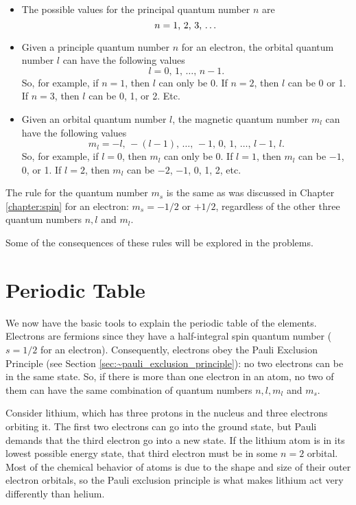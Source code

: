 \begin{itemize}
    \item The possible values for the principal quantum number $n$ are 
     \begin{equation}
     n = \mbox{1, 2, 3, \dots}
\end{equation}
\item Given a principle quantum number $n$ for an electron, the
  orbital quantum number $l$ can have the following values
    \begin{equation}
      l= 0,\, 1,\, \dots,\, n-1  .
    \label{eq:lquantumnumber}
    \end{equation}
    So, for example, if $n=1$, then $l$ can only be 0.  If $n=2$, then
    $l$ can be 0 or 1.  If $n=3$, then $l$ can be 0, 1, or 2.  Etc.
  \item Given an orbital quantum number $l$, the magnetic quantum
    number $m_l$ can have the following values
    \begin{equation}
      m_l=-l,\, -(l-1),\, \dots,\, -1,\, 0,\, 1,\, \dots,\, l-1,\, l  .
    \label{eq:mlquantumnumber}
    \end{equation}
    So, for example, if $l=0$, then $m_l$ can only be 0.  If $l=1$,
    then $m_l$ can be $-1$, 0, or 1.  If $l=2$, then $m_l$ can be
    $-2$, $-1$, 0, 1, 2,  etc.
\end{itemize}
The rule for the quantum number $m_s$ is the same as was discussed
in Chapter \ref{chapter:spin} for an electron: $m_s = -1/2$ or $+1/2$, 
regardless of the other three quantum numbers $n, l$ and $m_l$.

Some of the consequences of these rules will be explored in the
problems.

\section{Periodic Table}
\label{sec:periodic_table}

We now have the basic tools to explain the periodic table of the 
elements. Electrons are fermions since they have a half-integral
spin quantum number ($s = 1/2$ for an electron). Consequently,
electrons obey the Pauli Exclusion Principle (see Section
\ref{sec:~pauli_exclusion_principle}): no two electrons can be in the same
state. So, if there is more than one electron in an atom, no
two of them can have the same combination of quantum numbers
$n, l, m_l$ and $m_s$.

Consider lithium, which has three protons in the nucleus
and three electrons orbiting it.  The first two electrons can go into
the ground state, but Pauli demands that the third electron go into a
new state.  If the lithium atom is in its lowest possible energy
state, that third electron must be in some $n=2$ orbital.  Most of the
chemical behavior of atoms is due to the shape and size of their outer
electron orbitals, so the Pauli exclusion principle is what makes
lithium act very differently than helium.

